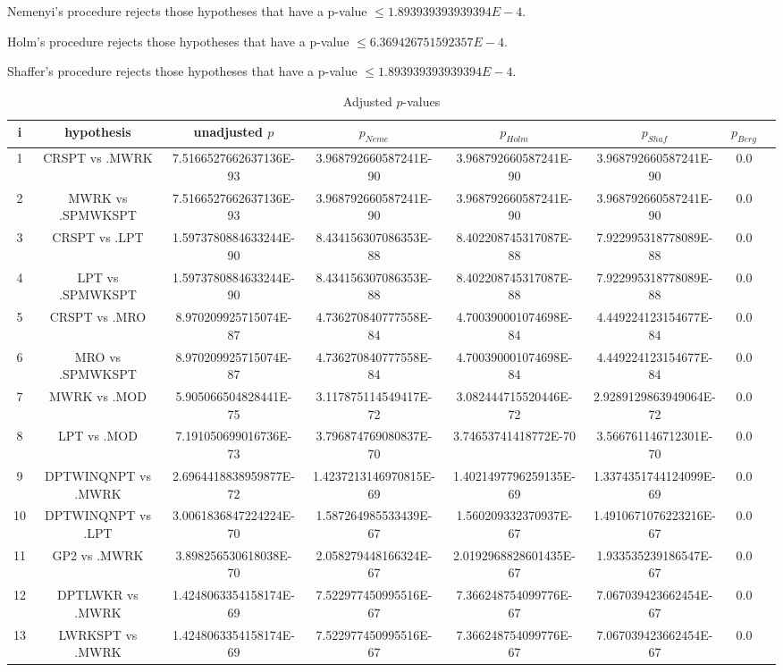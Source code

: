 \documentclass[a3paper,10pt]{article}
\begin{document}
Nemenyi's procedure rejects those hypotheses that have a p-value $\le1.893939393939394E-4$.


Holm's procedure rejects those hypotheses that have a p-value $\le6.369426751592357E-4$.


Shaffer's procedure rejects those hypotheses that have a p-value $\le1.893939393939394E-4$.


\begin{table}[!htp]
\centering\tiny
\caption{Adjusted $p$-values}
\begin{tabular}{cccccccc}
i&hypothesis&unadjusted $p$&$p_{Neme}$&$p_{Holm}$&$p_{Shaf}$&$p_{Berg}$\\
\hline
1&CRSPT vs .MWRK&7.5166527662637136E-93&3.968792660587241E-90&3.968792660587241E-90&3.968792660587241E-90&0.0\\
2&MWRK vs .SPMWKSPT&7.5166527662637136E-93&3.968792660587241E-90&3.968792660587241E-90&3.968792660587241E-90&0.0\\
3&CRSPT vs .LPT&1.5973780884633244E-90&8.434156307086353E-88&8.402208745317087E-88&7.922995318778089E-88&0.0\\
4&LPT vs .SPMWKSPT&1.5973780884633244E-90&8.434156307086353E-88&8.402208745317087E-88&7.922995318778089E-88&0.0\\
5&CRSPT vs .MRO&8.970209925715074E-87&4.736270840777558E-84&4.700390001074698E-84&4.449224123154677E-84&0.0\\
6&MRO vs .SPMWKSPT&8.970209925715074E-87&4.736270840777558E-84&4.700390001074698E-84&4.449224123154677E-84&0.0\\
7&MWRK vs .MOD&5.905066504828441E-75&3.117875114549417E-72&3.082444715520446E-72&2.9289129863949064E-72&0.0\\
8&LPT vs .MOD&7.191050699016736E-73&3.796874769080837E-70&3.74653741418772E-70&3.566761146712301E-70&0.0\\
9&DPTWINQNPT vs .MWRK&2.6964418838959877E-72&1.4237213146970815E-69&1.4021497796259135E-69&1.3374351744124099E-69&0.0\\
10&DPTWINQNPT vs .LPT&3.0061836847224224E-70&1.587264985533439E-67&1.560209332370937E-67&1.4910671076223216E-67&0.0\\
11&GP2 vs .MWRK&3.898256530618038E-70&2.058279448166324E-67&2.0192968828601435E-67&1.933535239186547E-67&0.0\\
12&DPTLWKR vs .MWRK&1.4248063354158174E-69&7.522977450995516E-67&7.366248754099776E-67&7.067039423662454E-67&0.0\\
13&LWRKSPT vs .MWRK&1.4248063354158174E-69&7.522977450995516E-67&7.366248754099776E-67&7.067039423662454E-67&0.0\\

\end{tabular}
\end{table}
\end{document}

